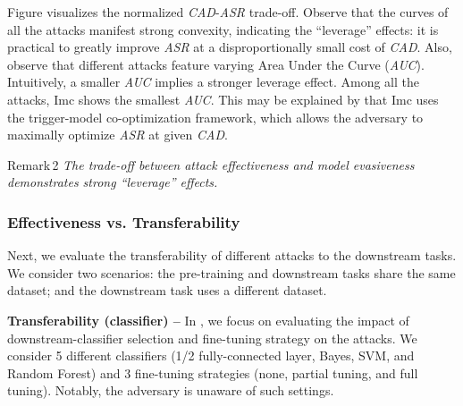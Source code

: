 \documentclass[compsoc,conference,a4paper,10pt,times]{IEEEtran}
\newcommand{\imc}{{\sc Imc}\xspace}
\newcommand{\asr}{{\em \small ASR}\xspace}
\newcommand{\cad}{{\em \small CAD}\xspace}
\newcommand{\auc}{{\em \small AUC}\xspace}
\begin{document}
Figure visualizes the normalized \cad-\asr trade-off. Observe that the curves of all the attacks manifest strong convexity, indicating the ``leverage'' effects: it is practical to greatly improve \asr at a disproportionally small cost of \cad. Also, observe that different attacks feature varying
Area Under the Curve (\auc). Intuitively, a smaller \auc implies a stronger leverage effect. Among all the attacks, \imc shows the smallest \auc. This may be explained by that \imc uses the trigger-model co-optimization framework, which allows the adversary to maximally optimize \asr at given \cad.


\begin{mtbox}{\small Remark\,2}
{\em \small The trade-off between attack effectiveness and model evasiveness demonstrates strong ``leverage'' effects.} 
\end{mtbox}


\subsubsection{Effectiveness vs. Transferability}

Next, we evaluate the transferability of different attacks to the downstream tasks. We consider two scenarios:  the pre-training and downstream tasks share the same dataset; and  the downstream task uses a different dataset.

\vspace{2pt}
{\bf Transferability (classifier) --} In , we focus on evaluating the impact of downstream-classifier selection and fine-tuning strategy on the attacks. We consider 5 different classifiers (1/2 fully-connected layer, Bayes, SVM, and Random Forest) and 3 fine-tuning strategies (none, partial tuning, and full tuning). Notably, the adversary is unaware of such settings.
\end{document}

